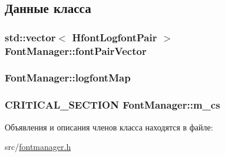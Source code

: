 \subsection{Данные класса}
\hypertarget{class_font_manager_aa50d6f013a9f72cc63a33370a5ee87d7}{
\subsubsection[{font\-Pair\-Vector}]{\setlength{\rightskip}{0pt plus 5cm}std\-::vector$<$ {\bf Hfont\-Logfont\-Pair} $>$ Font\-Manager\-::font\-Pair\-Vector\hspace{0.3cm}{\ttfamily [protected]}}}\label{class_font_manager_aa50d6f013a9f72cc63a33370a5ee87d7}
\hypertarget{class_font_manager_a8834f43163db4be815db7a2cb236a36e}{
\subsubsection[{logfont\-Map}]{ Font\-Manager\-::logfont\-Map\hspace{0.3cm}{\ttfamily [protected]}}}\label{class_font_manager_a8834f43163db4be815db7a2cb236a36e}
\hypertarget{class_font_manager_ae59f42d519931bb99c3a1caaf7d560c0}{
\subsubsection[{m\-\_\-cs}]{\setlength{\rightskip}{0pt plus 5cm}C\-R\-I\-T\-I\-C\-A\-L\-\_\-\-S\-E\-C\-T\-I\-O\-N Font\-Manager\-::m\-\_\-cs\hspace{0.3cm}{\ttfamily [protected]}}}\label{class_font_manager_ae59f42d519931bb99c3a1caaf7d560c0}


Объявления и описания членов класса находятся в файле\-:\begin{DoxyCompactItemize}
\item 
src/\hyperlink{fontmanager_8h}{fontmanager.\-h}\end{DoxyCompactItemize}

